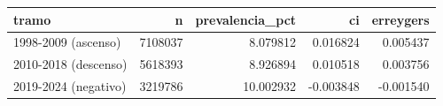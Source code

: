 \begin{tabular}{lrrrr}
\toprule
tramo & n & prevalencia\_pct & ci & erreygers \\
\midrule
1998-2009 (ascenso) & 7108037 & 8.079812 & 0.016824 & 0.005437 \\
2010-2018 (descenso) & 5618393 & 8.926894 & 0.010518 & 0.003756 \\
2019-2024 (negativo) & 3219786 & 10.002932 & -0.003848 & -0.001540 \\
\bottomrule
\end{tabular}
